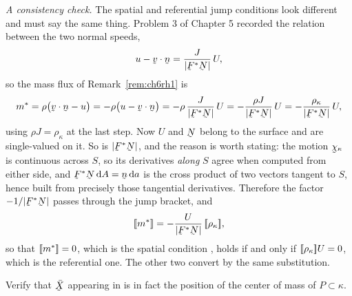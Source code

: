 \begin{solution}
\medskip
\noindent\emph{A consistency check.}
The spatial and referential jump conditions look different and must say
the same thing. Problem 3 of Chapter 5 recorded the relation between
the two normal speeds,
\[
   u-\ip\bv\bn=\frac{J}{|\bF^{*}\bN|}\,U ,
\]
so the mass flux of Remark~\ref{rem:ch6rh1} is
\[
   m^{*}=\rho\big(\ip\bv\bn-u\big)
   =-\rho\big(u-\ip\bv\bn\big)
   =-\rho\,\frac{J}{|\bF^{*}\bN|}\,U
   =-\frac{\rho J}{|\bF^{*}\bN|}\,U
   =-\frac{\rho_{\kappa}}{|\bF^{*}\bN|}\,U ,
\]
using $\rho J=\rho_{\kappa}$ at the last step. Now $U$ and $\bN$ belong
to the surface and are single-valued on it. So is $|\bF^{*}\bN|$, and
the reason is worth stating: the motion $\bchi_{\kappa}$ is continuous
across $S$, so its derivatives \emph{along} $S$ agree when computed from
either side, and $\bF^{*}\bN\,\dl A=\bn\,\dl a$ is the cross product of
two vectors tangent to $S$, hence built from precisely those tangential
derivatives. Therefore the factor $-1/|\bF^{*}\bN|$ passes through the
jump bracket, and
\[
   \jump{m^{*}}
   =-\frac{U}{|\bF^{*}\bN|}\,\jump{\rho_{\kappa}} ,
\]
so that $[\![m^{*}]\!]=0$, which is the spatial condition ,
holds if and only if $[\![\rho_{\kappa}]\!]U=0$, which is the referential
one. The other two convert by the same substitution.
\end{solution}

\begin{problem}
Verify that $\bar{\bX}$ appearing in  is in fact the position
of the center of mass of $P\subset\kappa$.
\end{problem}

